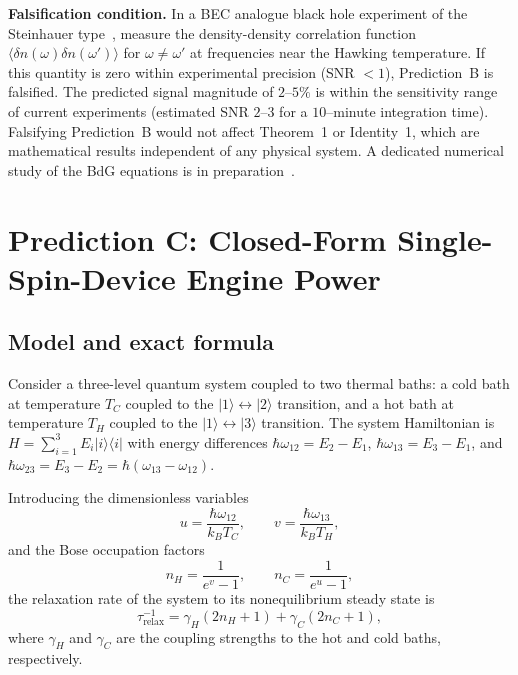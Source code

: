 \documentclass[aps,pra,preprint,groupedaddress,amsmath,amssymb,floatfix]{revtex4-2}
\begin{document}
\textbf{Falsification condition.} In a BEC analogue black hole experiment of the Steinhauer type~\cite{steinhauer2016}, measure the density-density correlation function $\langle \delta n(\omega) \delta n(\omega') \rangle$ for $\omega \neq \omega'$ at frequencies near the Hawking temperature. If this quantity is zero within experimental precision (SNR $< 1$), Prediction~B is falsified. The predicted signal magnitude of $2$--$5\%$ is within the sensitivity range of current experiments (estimated SNR $2$--$3$ for a $10$--minute integration time). Falsifying Prediction~B would not affect Theorem~1 or Identity~1, which are mathematical results independent of any physical system. A dedicated numerical study of the BdG equations is in preparation~\cite{huang2026}.

\section{Prediction C: Closed-Form Single-Spin-Device Engine Power}

\subsection{Model and exact formula}

Consider a three-level quantum system coupled to two thermal baths: a cold bath at temperature $T_C$ coupled to the $|1\rangle \leftrightarrow |2\rangle$ transition, and a hot bath at temperature $T_H$ coupled to the $|1\rangle \leftrightarrow |3\rangle$ transition. The system Hamiltonian is $H = \sum_{i=1}^3 E_i |i\rangle\langle i|$ with energy differences $\hbar\omega_{12} = E_2 - E_1$, $\hbar\omega_{13} = E_3 - E_1$, and $\hbar\omega_{23} = E_3 - E_2 = \hbar(\omega_{13} - \omega_{12})$.

Introducing the dimensionless variables
\begin{equation}
u = \frac{\hbar\omega_{12}}{k_B T_C}, \qquad
v = \frac{\hbar\omega_{13}}{k_B T_H},
\end{equation}
and the Bose occupation factors
\begin{equation}
n_H = \frac{1}{e^{v} - 1}, \qquad
n_C = \frac{1}{e^{u} - 1},
\end{equation}
the relaxation rate of the system to its nonequilibrium steady state is
\begin{equation}
\tau_{\text{relax}}^{-1} = \gamma_H (2n_H + 1) + \gamma_C (2n_C + 1),
\end{equation}
where $\gamma_H$ and $\gamma_C$ are the coupling strengths to the hot and cold baths, respectively.
\end{document}
